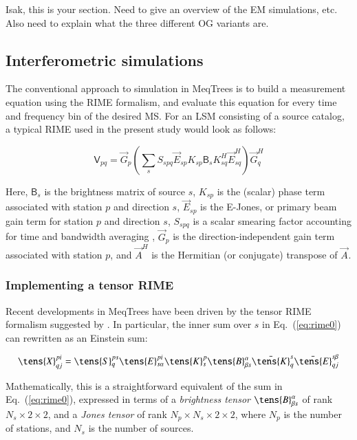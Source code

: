 \documentclass{aa}
\newcommand{\herm}{H}
\newcommand{\jones}[2]{\vec {#1}_{#2}}
\newcommand{\jonesT}[2]{\vec {#1}^{\herm}_{#2}}
\newcommand{\coh}[2]{\mathsf{{#1}}_{{#2}}}
\begin{document}
Isak, this is your section. Need to give an overview of the EM simulations, etc. Also need to explain what the three different OG variants are.

\subsection{Interferometric simulations}

The conventional approach to simulation in MeqTrees is to build a measurement equation using the RIME formalism, and evaluate this equation for every time and frequency bin of the desired MS. For an LSM consisting of a source catalog, a typical RIME used in the present study would look as follows:

  \begin{equation}\label{eq:rime0}
  \coh{V}{pq} = \jones{G}{p} \left ( \sum_{s} S_{spq} {\jones{E}{sp} K_{sp} \coh{B}{s} K^\herm_{sq} \jonesT{E}{sq}} \right ) \jonesT{G}{q}
  \end{equation}

Here, $\coh{B}{s}$ is the brightness matrix of source $s$, $K_{sp}$ is the (scalar) phase term associated with station $p$  and direction $s$, $\jones{E}{sp}$ is the E-Jones, or primary beam gain term for station $p$ and direction $s$, $S_{spq}$ is a scalar smearing factor accounting for time and bandwidth averaging \citep[implemented as per Eq. (23) of ][]{RRIME1}, $\jones{G}{p}$ is the direction-independent gain term associated with station $p$, and $\jonesT{A}{}$ is the Hermitian (or conjugate) transpose of $\jones{A}{}$.

\subsubsection{Implementing a tensor RIME}

Recent developments in MeqTrees have been driven by the tensor RIME formalism suggested by \citet{RRIME4}. In particular, the inner sum over $s$ in Eq.~(\ref{eq:rime0}) can rewritten as an Einstein sum:

\begin{equation}
\label{eq:trime}
\tens{X}^{pi}_{qj} = 
  \tens{S}_{q}^{ps}\tens{E}_{s\alpha}^{pi}\tens{K}_{s}^{p}
  \tens{B}^\alpha_{\beta s}
  \bar\tens{K}_{q}^{s}
  \bar\tens{E}_{qj}^{s\beta}
\end{equation}

Mathematically, this is a straightforward equivalent of the sum in Eq.~(\ref{eq:rime0}), expressed in terms of a {\em brightness tensor} $\tens{B}^\alpha_{\beta s}$ of rank $N_s\times2\times2$, and a \emph{Jones tensor} of rank $N_p\times N_s\times2\times2$, where $N_p$ is the number of stations, and $N_s$ is the number of sources.
\end{document}
